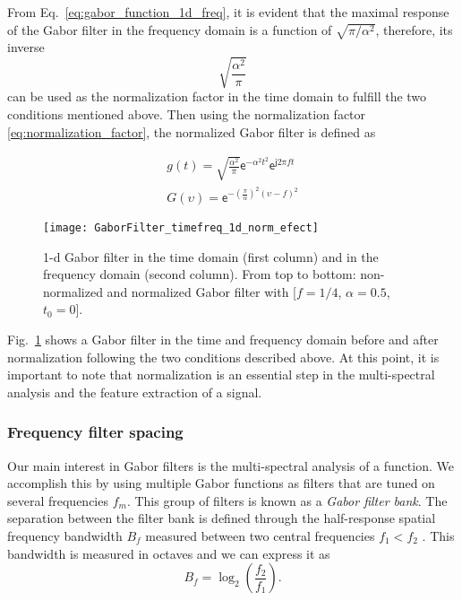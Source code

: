 From Eq.\ \eqref{eq:gabor_function_1d_freq}, it is evident that the maximal response of the Gabor filter in the frequency domain is a function of $\sqrt{\pi/\alpha^2}$, therefore, its inverse
\begin{equation}\label{eq:normalization_factor}
    \sqrt{\frac{\alpha^2}{\pi}}
\end{equation}
can be used as the normalization factor in the time domain to fulfill the two conditions mentioned above. Then using the normalization factor \eqref{eq:normalization_factor}, the normalized Gabor filter is defined as

\begin{equation}\label{eq:gabor_function_1d_timefreq_normalized}
    \begin{gathered}
         g(t) =  \sqrt{\frac{\alpha^2}{\pi}} \mathsf{e}^{-\alpha^2 t^2} \mathsf{e}^{\mathsf{j} 2 \pi f t } \\
         G(\upsilon) =  \mathsf{e}^{-\left(\frac{\pi}{\alpha}\right) ^2 (\upsilon-f)^2}
     \end{gathered}
\end{equation}

\begin{figure}[!ht]
	\centering
	\texttt{[image: GaborFilter\_timefreq\_1d\_norm\_efect]}
	\caption{1-d Gabor filter in the time domain (first column) and in the frequency domain (second  column). From top to bottom: non-normalized and normalized Gabor filter with [$f =1/4$, $\alpha=0.5$, $t_0=0$].}\label{fig:GaborFilter_timefreq_norm_efect}
\end{figure}

Fig.\ \ref{fig:GaborFilter_timefreq_norm_efect} shows a Gabor filter in the time and frequency domain before and after normalization following the two conditions described above. At this point, it is important to note that normalization is an essential step in the multi-spectral analysis and the feature extraction of a signal.

\subsubsection{Frequency filter spacing}\label{subsec:frequency_filter_spacing}
Our main interest in Gabor filters is the multi-spectral analysis of a function. We accomplish this by using multiple Gabor functions as filters that are tuned on several frequencies $f_m$. This group of filters is known as a \textit{Gabor filter bank}. The separation between the filter bank is defined through the half-response spatial frequency bandwidth $B_f$ measured between two central frequencies $f_1 < f_2$ \citep{Granlund:CGIP:1978}. This bandwidth is measured in octaves and we can express it as
\begin{equation}\label{eq:octave_spacing}
    B_f = \log_2 \left( \frac{f_2}{f_1} \right).
\end{equation}

